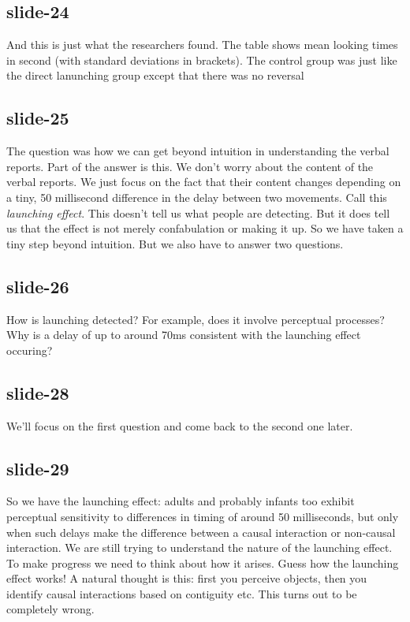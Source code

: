 \documentclass[12pt,\papersize]{extarticle}
\begin{document}
 
\subsection{slide-24}
And this is just what the researchers found. The table shows mean looking times in second (with standard deviations in brackets). The control group was just like the direct lanunching group except that there was no reversal
 
 
\subsection{slide-25}
The question was how we can get beyond intuition in understanding the verbal reports.
Part of the answer is this. We don't worry about the content of the verbal reports. We just focus on the fact that their content changes depending on a tiny, 50 millisecond difference in the delay between two movements. Call this \emph{launching effect}.
This doesn't tell us what people are detecting. But it does tell us that the effect is not merely confabulation or making it up. So we have taken a tiny step beyond intuition. But we also have to answer two questions.
 
 
\subsection{slide-26}
How is launching detected? For example, does it involve perceptual processes?
Why is a delay of up to around 70ms consistent with the launching effect occuring?
 
 
\subsection{slide-28}
We'll focus on the first question and come back to the second one later.
 
 
\subsection{slide-29}
So we have the launching effect: adults and probably infants too exhibit perceptual sensitivity to differences in timing of around 50 milliseconds, but only when such delays make the difference between a causal interaction or non-causal interaction.
We are still trying to understand the nature of the launching effect. To make progress we need to think about how it arises.
Guess how the launching effect works! A natural thought is this: first you perceive objects, then you identify causal interactions based on contiguity etc. This turns out to be completely wrong.
 
\end{document}
